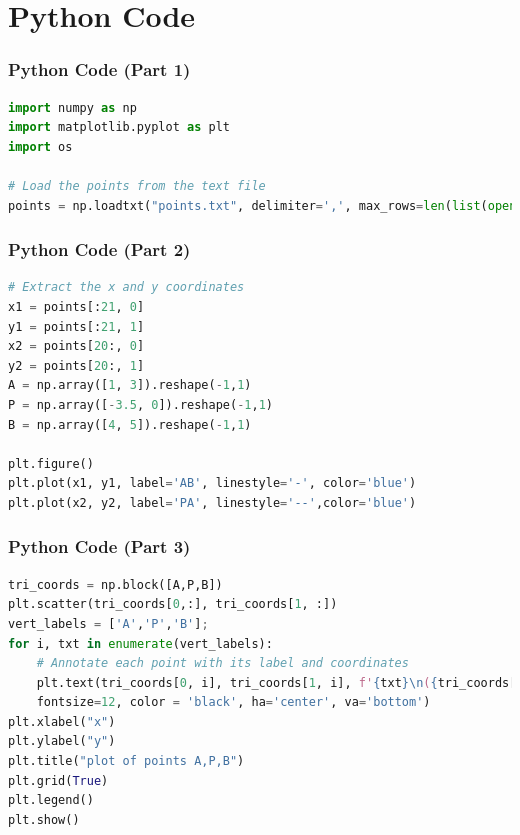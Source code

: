 \documentclass{beamer}
\theoremstyle{remark}
\begin{document}
\section{Python Code}
\begin{frame}[fragile]
\frametitle{Python Code (Part 1)}
\vspace{0.3cm} %
\begin{lstlisting}[language=Python]
import numpy as np
import matplotlib.pyplot as plt
import os

# Load the points from the text file
points = np.loadtxt("points.txt", delimiter=',', max_rows=len(list(open("./points.txt")))-1)
\end{lstlisting}
\vspace{0.3cm} %
\end{frame}

\begin{frame}[fragile]
\frametitle{Python Code (Part 2)}
\vspace{0.3cm} %
\begin{lstlisting}[language=Python]
# Extract the x and y coordinates
x1 = points[:21, 0]
y1 = points[:21, 1]
x2 = points[20:, 0]
y2 = points[20:, 1]
A = np.array([1, 3]).reshape(-1,1)
P = np.array([-3.5, 0]).reshape(-1,1)
B = np.array([4, 5]).reshape(-1,1)

plt.figure()
plt.plot(x1, y1, label='AB', linestyle='-', color='blue')
plt.plot(x2, y2, label='PA', linestyle='--',color='blue')
\end{lstlisting}
\vspace{0.3cm} %
\end{frame}

\begin{frame}[fragile]
\frametitle{Python Code (Part 3)}
\vspace{0.3cm} %
\begin{lstlisting}[language=Python]
tri_coords = np.block([A,P,B])  
plt.scatter(tri_coords[0,:], tri_coords[1, :])
vert_labels = ['A','P','B'];
for i, txt in enumerate(vert_labels):
    # Annotate each point with its label and coordinates
    plt.text(tri_coords[0, i], tri_coords[1, i], f'{txt}\n({tri_coords[0, i]:.2f}, {tri_coords[1, i]:.2f})',
    fontsize=12, color = 'black', ha='center', va='bottom')
plt.xlabel("x")
plt.ylabel("y")
plt.title("plot of points A,P,B")
plt.grid(True)
plt.legend()
plt.show()
\end{lstlisting}
\vspace{0.3cm} %
\end{frame}
\end{document}
